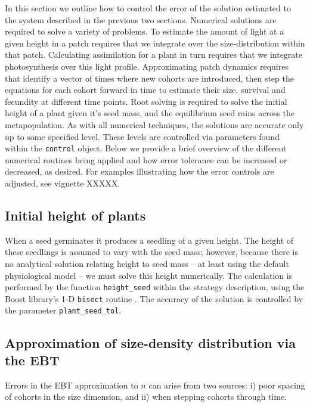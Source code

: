 \documentclass[10pt,twoside]{article}
\begin{document}
In this section we outline how to control the error of the solution
estimated to the system described in the previous two sections.
Numerical solutions are required to solve a variety of problems. To
estimate the amount of light at a given height in a patch requires that
we integrate over the size-distribution within that patch. Calculating
assimilation for a plant in turn requires that we integrate
photosynthesis over this light profile. Approximating patch dynamics
requires that identify a vector of times where new cohorts are
introduced, then step the equations for each cohort forward in time to
estimate their size, survival and fecundity at different time points.
Root solving is required to solve the initial height of a plant given
it's seed mass, and the equilibrium seed rains across the
metapopulation. As with all numerical techniques, the solutions are
accurate only up to some specified level. These levels are controlled
via parameters found within the \texttt{control} object. Below we
provide a brief overview of the different numerical routines being
applied and how error tolerance can be increased or decreased, as
desired. For examples illustrating how the error controls are adjusted,
see vignette XXXXX.

\subsection{Initial height of plants}\label{initial-height-of-plants}

When a seed germinates it produces a seedling of a given height. The
height of these seedlings is assumed to vary with the seed mass;
however, because there is no analytical solution relating height to seed
mass -- at least using the default physiological model -- we must solve
this height numerically. The calculation is performed by the function
\texttt{height\_seed} within the strategy description, using the Boost
library's 1-D \texttt{bisect} routine
\citep{Schaling-2014, Eddelbuettel-2015}. The accuracy of the solution
is controlled by the parameter \texttt{plant\_seed\_tol}.

\subsection{Approximation of size-density distribution via the
EBT}\label{approximation-of-size-density-distribution-via-the-ebt}

Errors in the EBT approximation to \(n\) can arise from two sources: i)
poor spacing of cohorts in the size dimension, and ii) when stepping
cohorts through time.
\end{document}
